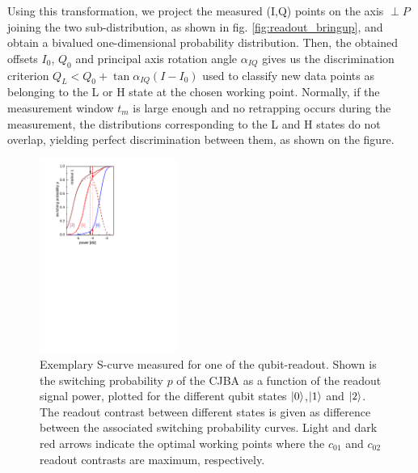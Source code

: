 %
Using this transformation, we project the measured (I,Q) points on the axis $\perp P$ joining the two sub-distribution, as shown in fig. \ref{fig:readout_bringup}, and obtain a bivalued one-dimensional probability distribution. Then, the obtained offsets $I_0$, $Q_0$ and principal axis rotation angle $\alpha_{IQ}$ gives us the discrimination criterion $Q_L<Q_0+\tan{\alpha_{IQ}}(I-I_0)$ used to classify new data points as belonging to the L or H state at the chosen working point. Normally, if the measurement window $t_m$ is large enough and no retrapping occurs during the measurement, the distributions corresponding to the L and H states do not overlap, yielding perfect discrimination between them, as shown on the figure.

\begin{figure}
\centering
\includegraphics[width=0.4\textwidth]{./material/papers/grover/figures/s_curves_example}
\caption{Exemplary S-curve measured for one of the qubit-readout. Shown is the switching probability $p$ of the CJBA as a function of the readout signal power, plotted for the different qubit states $\left| 0 \right>$,$\left| 1 \right>$ and $\left| 2 \right>$. The readout contrast between different states is given as difference between the associated switching probability curves. Light and dark red arrows indicate the optimal working points where the $c_{01}$ and $c_{02}$ readout contrasts are maximum, respectively.}
\label{fig:s_curves_example}
\end{figure}

\smallskip

